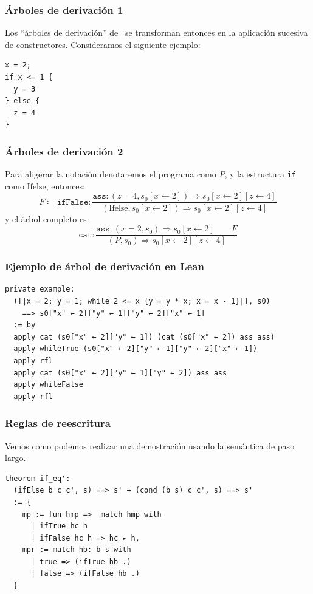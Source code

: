 \documentclass[9pt]{beamer}
\newcommand{\funfont}[1]{\texttt{#1}}
\newcommand{\ImpAssign}[2]{{#1} = {#2}}
\newcommand{\bigstep}{\Longrightarrow}
\begin{document}
\begin{frame}[fragile]
\frametitle{Árboles de derivación 1}
    Los \enquote{árboles de derivación} de~\cite{winskel_formal_semantics} se transforman
    entonces en la aplicación sucesiva de constructores. Consideramos el siguiente ejemplo:
\begin{verbatim}
x = 2;
if x <= 1 {
  y = 3
} else {
  z = 4
}
\end{verbatim}
\end{frame}

\begin{frame}
\frametitle{Árboles de derivación 2}
Para aligerar la notación denotaremos el programa como \(P\), y la estructura 
\texttt{if} como \(\text{Ifelse}\), entonces:
\[
F \coloneqq \funfont{ifFalse}: \displaystyle{\frac{
    \funfont{ass}: (\ImpAssign{z}{4} , s_0[x \leftarrow 2]) \bigstep s_0[x \leftarrow 2][z \leftarrow 4]
    }
{
    (\text{Ifelse}, s_0[x \leftarrow 2]) \bigstep s_0[x \leftarrow 2][z \leftarrow 4]
}}
\]
y el árbol completo es:
\[
\funfont{cat}: \frac{
\funfont{ass}: (\ImpAssign{x}{2}, s_0) \bigstep s_0[x \leftarrow 2]
\qquad
F
}{
(P, s_0) \bigstep s_0[x \leftarrow 2][z \leftarrow 4]
}
\]
\end{frame}

\begin{frame}[fragile]
\frametitle{Ejemplo de árbol de derivación en Lean}
\begin{verbatim}
private example: 
  ([|x = 2; y = 1; while 2 <= x {y = y * x; x = x - 1}|], s0)
    ==> s0["x" ← 2]["y" ← 1]["y" ← 2]["x" ← 1] 
  := by
  apply cat (s0["x" ← 2]["y" ← 1]) (cat (s0["x" ← 2]) ass ass)
  apply whileTrue (s0["x" ← 2]["y" ← 1]["y" ← 2]["x" ← 1])
  apply rfl
  apply cat (s0["x" ← 2]["y" ← 1]["y" ← 2]) ass ass
  apply whileFalse
  apply rfl
\end{verbatim}
\end{frame}

\begin{frame}[fragile]
\frametitle{Reglas de reescritura}

Vemos como podemos realizar una demostración usando la semántica de paso largo.

\begin{verbatim}
theorem if_eq': 
  (ifElse b c c', s) ==> s' ↔ (cond (b s) c c', s) ==> s' 
  := {
    mp := fun hmp =>  match hmp with 
      | ifTrue hc h 
      | ifFalse hc h => hc ▸ h,
    mpr := match hb: b s with 
      | true => (ifTrue hb .) 
      | false => (ifFalse hb .)
  }
\end{verbatim}
\end{frame}
\end{document}
